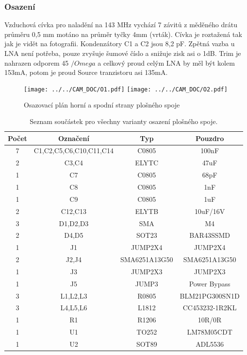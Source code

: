 \documentclass[12pt,a4paper,oneside]{article}
\begin{document}
\subsubsection{Osazení}

Vzduchová cívka pro naladění na 143 MHz vychází 7 závitů z měděného drátu průměru 0,5 mm motáno na průměr tyčky 4mm (vrták). Cívka je roztažená tak jak je vidět na fotografii. Kondenzátory C1 a C2 jsou 8,2 pF. Zpětná vazba u LNA není potřeba, pouze zvyšuje šumové číslo a snižuje zisk asi o 1dB. Trim je nahrazen odporem 45 $/Omega$ a celkový proud celým LNA by měl být kolem 153mA, potom je proud Source tranzistoru asi 135mA. 

\newpage


\begin{figure} [h!tbp]
  \centering
  \texttt{[image: ../../CAM\_DOC/O1.pdf]}
  \texttt{[image: ../../CAM\_DOC/O2.pdf]}
  \caption{Osazovací plán horní a spodní strany plošného spoje}
  \label{fig:osazovaci_plan}
\end{figure}

\begin{savenotes}
\begin{table}[h!]
\begin{center}
\begin{tabular}{ |c|c|c|c| }
\hline 
Počet & Označení & Typ  & Pouzdro  \\ 
\hline 
7	&	C1,C2,C5,C6,C10,C11,C14	&	C0805	&	100nF	\\
2	&	C3,C4	&	ELYTC	&	47uF	\\
1	&	C7	&	C0805	&	68pF	\\
1	&	C8	&	C0805	&	1nF	\\
1	&	C9	&	C0805	&	1uF	\\
2	&	C12,C13	&	ELYTB	&	10uF/16V	\\
3	&	D1,D2,D3	&	SMA	&	M4	\\
2	&	D4,D5	&	SOT23	&	BAR43SSMD	\\
1	&	J1	&	JUMP2X4	&	JUMP2X4	\\
2	&	J2,J4	&	SMA6251A13G50	&	SMA6251A13G50	\\
1	&	J3	&	JUMP2X3	&	JUMP2X3	\\
1	&	J5	&	JUMP3	&	Power Bypass	\\
3	&	L1,L2,L3	&	R0805	&	BLM21PG300SN1D	\\
3	&	L4,L5,L6	&	L1812	&	CC453232-1R2KL	\\
1	&	R1	&	R1206	&	10R/0R	\\
1	&	U1	&	TO252	&	LM78M05CDT	\\
1	&	U2	&	SOT89	&	ADL5536	\\
\hline 
\end{tabular}
\end{center}
\caption{Seznam součástek pro všechny varianty osazení plošného spoje.}
\label{seznam_soucastek}
\end{table}
\end{savenotes}
\end{document}
